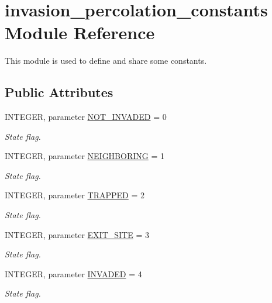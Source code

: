 \hypertarget{classinvasion__percolation__constants}{
\section{invasion\-\_\-percolation\-\_\-constants \-Module \-Reference}
\label{classinvasion__percolation__constants}
}


\-This module is used to define and share some constants.  


\subsection*{\-Public \-Attributes}
\begin{DoxyCompactItemize}
\item 
\-I\-N\-T\-E\-G\-E\-R, parameter \hyperlink{classinvasion__percolation__constants_aed7a90f1cf05ee48aa9ab767d4d758f9}{\-N\-O\-T\-\_\-\-I\-N\-V\-A\-D\-E\-D} = 0
\begin{DoxyCompactList}\small\item\em \-State flag. \end{DoxyCompactList}\item 
\-I\-N\-T\-E\-G\-E\-R, parameter \hyperlink{classinvasion__percolation__constants_a399688d428fc375c444f249be2ed3d6f}{\-N\-E\-I\-G\-H\-B\-O\-R\-I\-N\-G} = 1
\begin{DoxyCompactList}\small\item\em \-State flag. \end{DoxyCompactList}\item 
\-I\-N\-T\-E\-G\-E\-R, parameter \hyperlink{classinvasion__percolation__constants_a3f1df7c878ae4de6a5fbd1b34adb6a1d}{\-T\-R\-A\-P\-P\-E\-D} = 2
\begin{DoxyCompactList}\small\item\em \-State flag. \end{DoxyCompactList}\item 
\-I\-N\-T\-E\-G\-E\-R, parameter \hyperlink{classinvasion__percolation__constants_a537e873dfa2c4a77bd0b7a736d62db2e}{\-E\-X\-I\-T\-\_\-\-S\-I\-T\-E} = 3
\begin{DoxyCompactList}\small\item\em \-State flag. \end{DoxyCompactList}\item 
\-I\-N\-T\-E\-G\-E\-R, parameter \hyperlink{classinvasion__percolation__constants_a018c067c587c644a8ae939cfec98013e}{\-I\-N\-V\-A\-D\-E\-D} = 4
\begin{DoxyCompactList}\small\item\em \-State flag. \end{DoxyCompactList}\end{DoxyCompactItemize}


